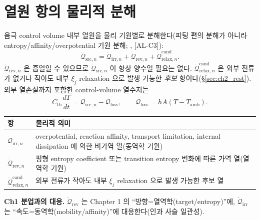 \documentclass[11pt,a4paper]{article}
\newcommand{\irr}{\mathrm{irr}}
\newcommand{\rev}{\mathrm{rev}}
\newcommand{\src}{\mathrm{src}}
\newcommand{\loss}{\mathrm{loss}}
\newcommand{\amb}{\mathrm{amb}}
\newcommand{\rlx}{\mathrm{relax}}
\newcommand{\cand}{\mathrm{cand}}
\newcommand{\AL}[1]{\textsf{[AL-#1]}}
\begin{document}
\section{열원 항의 물리적 분해}\label{sec:ch2_decomp}
음극 control volume 내부 열원을 물리 기원별로 분해한다(피팅 편의 분해가 아니라 entropy/affinity/overpotential
기원 분해; \cite{bernardi1985,rao1997}, \AL{C3}):
\begin{equation}
\dot{\mathcal Q}_{\src,n}=\dot{\mathcal Q}_{\irr,n}+\dot{\mathcal Q}_{\rev,n}+\dot{\mathcal Q}_{\rlx,n}^{\cand}.
\label{eq:ch2_srcdecomp}
\end{equation}
$\dot{\mathcal Q}_{\rev,n}$ 은 흡열일 수 있으므로 $\dot{\mathcal Q}_{\src,n}$ 이 항상 양수일 필요는 없다.
$\dot{\mathcal Q}_{\rlx,n}^{\cand}$ 은 외부 전류가 없거나 작아도 내부 $\xi_j$ relaxation 으로 발생 가능한
\emph{후보} 항이다(\S\ref{sec:ch2_rest}). 외부 열손실까지 포함한 control-volume 열수지는
\begin{equation}
C_{\mathrm{th}}\frac{dT}{dt}=\dot{\mathcal Q}_{\src,n}-\dot{\mathcal Q}_{\loss},\qquad
\dot{\mathcal Q}_{\loss}=hA(T-T_{\amb}).
\label{eq:ch2_balance}
\end{equation}
\begin{longtable}{p{} p{}}
\toprule 항 & 물리적 의미 \\ \midrule \endhead
$\dot{\mathcal Q}_{\irr,n}$ & overpotential, reaction affinity, transport limitation, internal dissipation 에 의한 비가역 열(동역학 기원) \\
$\dot{\mathcal Q}_{\rev,n}$ & 평형 entropy coefficient 또는 transition entropy 변화에 따른 가역 열(열역학 기원) \\
$\dot{\mathcal Q}_{\rlx,n}^{\cand}$ & 외부 전류가 작아도 내부 $\xi_j$ relaxation 으로 발생 가능한 후보 열 \\
\bottomrule
\end{longtable}
\textbf{Ch1 분업과의 대응.} $\dot{\mathcal Q}_{\rev}$ 는 Chapter 1 의 ``방향=열역학(target/entropy)''에,
$\dot{\mathcal Q}_{\irr}$ 는 ``속도=동역학(mobility/affinity)''에 대응한다(인과 사슬 일관성).

\end{document}
